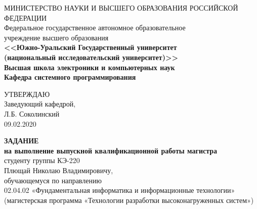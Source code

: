 \begin{titlepage}
    
    \begin{center}
        \footnotesize
        МИНИСТЕРСТВО НАУКИ И ВЫСШЕГО ОБРАЗОВАНИЯ РОССИЙСКОЙ ФЕДЕРАЦИИ\\
        \small
        Федеральное государственное автономное образовательное\\
        учреждение высшего образования\\
        \normalsize
        \textbf{
        <<Южно-Уральский Государственный университет\\
        (национальный исследовательский университет)>>\\
        \small
        Высшая школа электроники и компьютерных наук\\
        Кафедра системного программирования
        \normalsize
        }
        \bigskip
    \end{center}

    \hfill
    \begin{minipage}{0.4\textwidth}
        УТВЕРЖДАЮ\\
        Заведующий кафедрой,\\
        \underline{\hspace{2cm}} Л.Б. Соколинский\\
        09.02.2020
    \end{minipage}

    \begin{center}
        \textbf{ЗАДАНИЕ}\\
        \textbf{на выполнение выпускной квалификационной работы магистра}\\
        студенту группы КЭ-220\\
        Плющай Николаю Владимировичу,\\
        обучающемуся по направлению\\
        02.04.02 «Фундаментальная информатика и информационные технологии»\\
        (магистерская программа «Технологии разработки высоконагруженных систем»)\\
    \end{center}


\end{titlepage}

